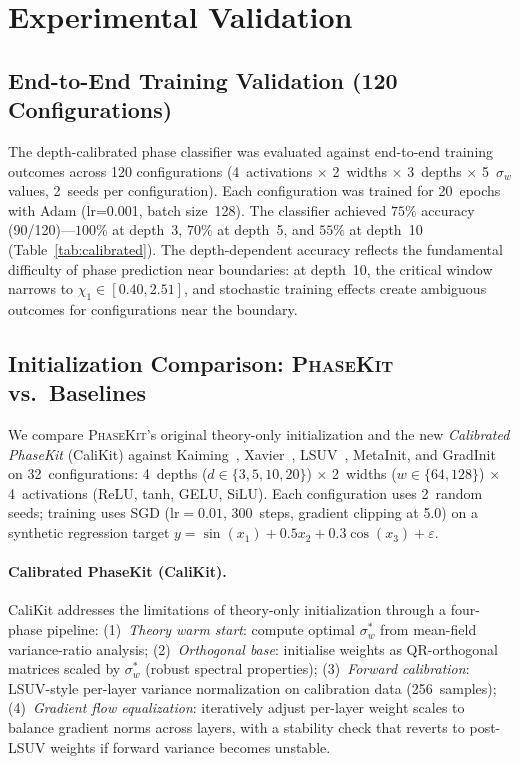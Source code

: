 \documentclass[10pt]{article}
\newcommand{\ToolName}{\textsc{PhaseKit}}
\begin{document}
\section{Experimental Validation}
\label{sec:experiments}

\subsection{End-to-End Training Validation (120 Configurations)}

The depth-calibrated phase classifier was evaluated against end-to-end training outcomes across 120 configurations (4~activations $\times$ 2~widths $\times$ 3~depths $\times$ 5~$\sigma_w$ values, 2~seeds per configuration).
Each configuration was trained for 20~epochs with Adam (lr=0.001, batch size~128).
The classifier achieved $75\%$ accuracy (90/120)---$100\%$ at depth~3, $70\%$ at depth~5, and $55\%$ at depth~10 (Table~\ref{tab:calibrated}).
The depth-dependent accuracy reflects the fundamental difficulty of phase prediction near boundaries: at depth~10, the critical window narrows to $\chi_1 \in [0.40, 2.51]$, and stochastic training effects create ambiguous outcomes for configurations near the boundary.

\subsection{Initialization Comparison: \ToolName{} vs.\ Baselines}
\label{sec:baseline-comparison}

We compare \ToolName{}'s original theory-only initialization and the new \emph{Calibrated PhaseKit} (CaliKit) against Kaiming~\cite{he2015delving}, Xavier~\cite{glorot2010understanding}, LSUV~\cite{mishkin2016all}, MetaInit, and GradInit on 32~configurations: 4~depths ($d \in \{3,5,10,20\}$) $\times$ 2~widths ($w \in \{64,128\}$) $\times$ 4~activations (ReLU, tanh, GELU, SiLU).
Each configuration uses 2~random seeds; training uses SGD (lr${}=0.01$, 300~steps, gradient clipping at 5.0) on a synthetic regression target $y = \sin(x_1) + 0.5x_2 + 0.3\cos(x_3) + \varepsilon$.

\paragraph{Calibrated PhaseKit (CaliKit).}
CaliKit addresses the limitations of theory-only initialization through a four-phase pipeline:
(1)~\emph{Theory warm start}: compute optimal $\sigma_w^*$ from mean-field variance-ratio analysis;
(2)~\emph{Orthogonal base}: initialise weights as QR-orthogonal matrices scaled by $\sigma_w^*$ (robust spectral properties);
(3)~\emph{Forward calibration}: LSUV-style per-layer variance normalization on calibration data (256~samples);
(4)~\emph{Gradient flow equalization}: iteratively adjust per-layer weight scales to balance gradient norms across layers, with a stability check that reverts to post-LSUV weights if forward variance becomes unstable.
\end{document}
